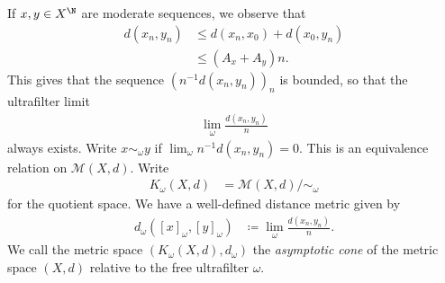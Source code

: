 \documentclass[10pt]{mypackage}
\renewcommand{\coloneq}{\coloneqq}
\begin{document}
If $x,y\in X^{\N}$ are moderate sequences, we observe that
\begin{align*}
  d\left( x_n,y_n \right) &\leq d\left( x_n,x_0 \right) + d\left( x_0,y_n \right)\\
                          &\leq \left( A_x + A_y \right)n.
\end{align*}
This gives that the sequence $\left( n^{-1}d\left( x_n,y_n \right) \right)_n$ is bounded, so that the ultrafilter limit
\begin{align*}
  \lim_{\omega} \frac{d\left( x_n,y_n \right)}{n}
\end{align*}
always exists. Write $x\sim_{\omega}y$ if $\lim_{\omega}n^{-1}d\left( x_n,y_n \right) = 0$. This is an equivalence relation on $ \mathcal{M}\left( X,d \right) $. Write
\begin{align*}
  K_{\omega}\left( X,d \right) &= \mathcal{M}\left( X,d \right)/\sim_{\omega}
\end{align*}
for the quotient space. We have a well-defined distance metric given by
\begin{align*}
  d_{\omega}\left( \left[ x \right]_{\omega},\left[ y \right]_{\omega} \right) &\coloneq \lim_{\omega} \frac{d\left( x_n,y_n \right)}{n}.
\end{align*}
We call the metric space $\left( K_{\omega}\left( X,d \right),d_{\omega} \right)$ the \textit{asymptotic cone} of the metric space $\left( X,d \right)$ relative to the free ultrafilter $\omega$.
\end{document}
